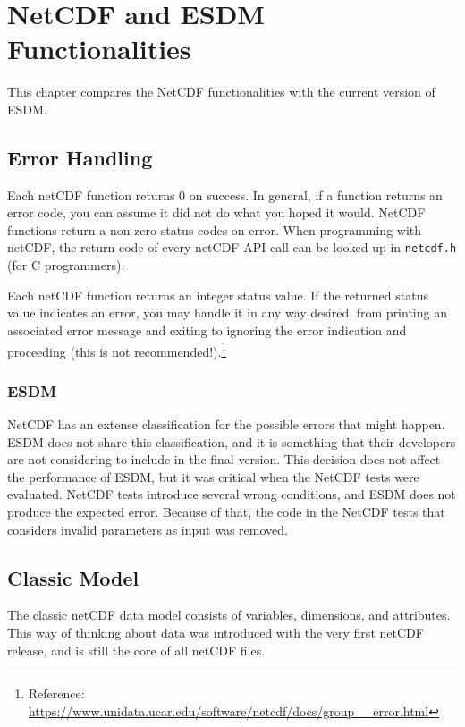 \chapter{NetCDF and ESDM Functionalities}
\label{ch:func}

\tab
This chapter compares the NetCDF functionalities with the current version of ESDM.

\section{Error Handling}

\tab
Each netCDF function returns 0 on success. In general, if a function returns an error code, you can assume it did not do what you hoped it would. NetCDF functions return a non-zero status codes on error. When programming with netCDF, the return code of every netCDF API call can be looked up in \texttt{netcdf.h} (for C programmers).

Each netCDF function returns an integer status value. If the returned status value indicates an error, you may handle it in any way desired, from printing an associated error message and exiting to ignoring the error indication and proceeding (this is not recommended!).\footnote{Reference: \url{https://www.unidata.ucar.edu/software/netcdf/docs/group__error.html}}

\subsection{ESDM}

\tab
NetCDF has an extense classification for the possible errors that might happen. ESDM does not share this classification, and it is something that their developers are not considering to include in the final version. This decision does not affect the performance of ESDM, but it was critical when the NetCDF tests were evaluated. NetCDF tests introduce several wrong conditions, and ESDM does not produce the expected error. Because of that, the code in the NetCDF tests that considers invalid parameters as input was removed.

\section{Classic Model}

The classic netCDF data model consists of variables, dimensions, and attributes. This way of thinking about data was introduced with the very first netCDF release, and is still the core of all netCDF files.

